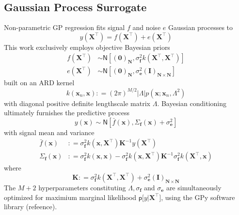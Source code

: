 \documentclass[preprint,12pt]{elsarticle}
\newcommand*{\M}[1]{\ensuremath{#1}\xspace}
\newcommand*{\vr}[1]{\M{\mathbf{#1}}}
\newcommand*{\deq}{\M{\mathrel{\mathop:}=}}
\newcommand*{\gauss}[2]{\mathsf{N}\!\left\lbrack{} #1 , #2 \right\rbrack}
\newcommand*{\modulus}[1]{\M{\left\lvert#1\right\rvert}}
\begin{document}
        \subsection{Gaussian Process Surrogate} \label{sub:Method:GP}
            Non-parametric GP regression fits signal $f$ and noise $e$ Gaussian processes to
            \begin{equation} \label{eq:Method:GP:Problem}
                y(\vr{X}^{\intercal}) = f(\vr{X}^{\intercal}) + e(\vr{X}^{\intercal})
            \end{equation}
            This work exclusively employs objective Bayesian priors
            \begin{align*}
                f(\vr{X}^{\intercal}) &\sim \gauss{(\vr{0})_{\vr{N}}}{\sigma_{\vr{f}}^{2} k(\vr{X}^{\intercal},\vr{X}^{\intercal})} \\
                e(\vr{X}^{\intercal}) &\sim \gauss{(\vr{0})_{\vr{N}}}{\sigma_{\vr{e}}^{2} (\vr{I})_{\vr{N}\times\vr{N}}} 
            \end{align*}
            built on an ARD kernel
            \begin{equation} \label{eq:Method:GP:Kernel}
                k(\vr{x}_{n},\vr{x}) \deq 
                (2 \pi)^{M/2} \modulus{\Lambda} p\!\left(\vr{x} ; \vr{x}_{n}, \Lambda^2\right) 
            \end{equation}
            with diagonal positive definite lengthscale matrix \(\Lambda\).
            Bayesian conditioning ultimately furnishes the predictive process
            \begin{equation*}
                y(\vr{x}) \sim \gauss{\bar{f}(\vr{x})}{\Sigma_{\vr{f}}(\vr{x}) + \sigma_{\vr{e}}^{2}}
            \end{equation*}
            with signal mean and variance
            \begin{equation} \label{eq:Method:GP:MeanAndVariance}
                \begin{aligned}
                    \bar{f}(\vr{x}) &\deq \sigma^{2}_\vr{f} k(\vr{x},\vr{X}^{\intercal})
                    \vr{K}^{-1} y(\vr{X}^{\intercal}) \\
                    \Sigma_{\vr{f}}(\vr{x}) &\deq \sigma^{2}_\vr{f} k(\vr{x},\vr{x})
                    - \sigma^{2}_\vr{f} k(\vr{x},\vr{X}^{\intercal})
                    \vr{K}^{-1} \sigma^{2}_\vr{f} k(\vr{X}^{\intercal},\vr{x})
                \end{aligned}
            \end{equation}
        where
            \begin{equation} \label{eq:Method:GP:KDef}
                \vr{K} \deq \sigma^{2}_\vr{f} k(\vr{X}^{\intercal},\vr{X}^{\intercal}) + \sigma_{\vr{e}}^{2} (\vr{I})_{\vr{N}\times\vr{N}}       
            \end{equation}
        The $M+2$ hyperparameters constituting $\Lambda, \sigma_{\vr{f}}$ and $\sigma_{\vr{e}}$ are simultaneously optimized for maximium marginal likelihood $\mathsf{p}\lbrack y \vert \vr{X}^{\intercal}\rbrack$, using the GPy software library (refeence).
\end{document}
